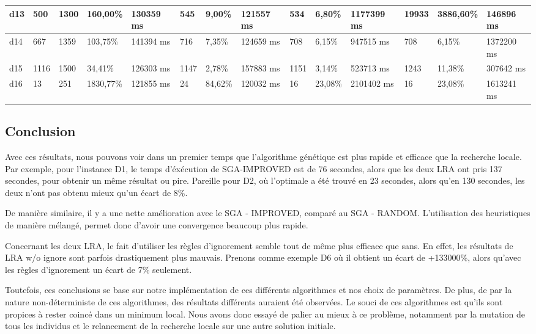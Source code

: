 \begin{table}[]
\begin{adjustbox}{angle=90}
{\begin{tabular}{|c|c|l|l|l|l|l|l|l|l|l|l|l|l|}
\multicolumn{1}{|l|}{d13} & \multicolumn{1}{l|}{500} &1300 & 160,00\% & 130359 ms  & 545 & 9,00\% & 121557 ms  & 534 & 6,80\% & 1177399 ms  & 19933 & 3886,60\% & 146896 ms \\ \hline
\multicolumn{1}{|l|}{d14} & \multicolumn{1}{l|}{667} &1359 & 103,75\% & 141394 ms  & 716 & 7,35\% & 124659 ms  & 708 & 6,15\% & 947515 ms  & 708 & 6,15\% & 1372200 ms \\ \hline
\multicolumn{1}{|l|}{d15} & \multicolumn{1}{l|}{1116} &1500 & 34,41\% & 126303 ms  & 1147 & 2,78\% & 157883 ms  & 1151 & 3,14\% & 523713 ms  & 1243 & 11,38\% & 307642 ms \\ \hline
\multicolumn{1}{|l|}{d16} & \multicolumn{1}{l|}{13} &251 & 1830,77\% & 121855 ms  & 24 & 84,62\% & 120032 ms  & 16 & 23,08\% & 2101402 ms  & 16 & 23,08\% & 1613241 ms \\ \hline

\end{tabular}}
\end{adjustbox}
\end{table}

\newpage
	\subsection{Conclusion}
	Avec ces résultats, nous pouvons voir dans un premier temps que l'algorithme génétique est plus rapide et efficace que la recherche locale. Par exemple, pour l'instance D1, le temps d'éxécution de SGA-IMPROVED est de 76 secondes, alors que 
les deux LRA ont pris 137 secondes, pour obtenir un même résultat ou pire. Pareille pour D2, où l'optimale a été trouvé en 23 secondes, alors qu'en 130 secondes, les deux n'ont pas obtenu mieux qu'un écart de 8\%.

	De manière similaire, il y a une nette amélioration avec le SGA - IMPROVED, comparé au SGA - RANDOM. L'utilisation des heuristiques de manière mélangé, permet donc d'avoir une convergence beaucoup plus rapide.

	Concernant les deux LRA, le fait d'utiliser les règles d'ignorement semble tout de même plus efficace que sans. En effet, les résultats de LRA w/o ignore sont parfois drastiquement plus mauvais. Prenons comme exemple D6 où il 
obtient un écart de +133000\%, alors qu'avec les règles d'ignorement un écart de 7\% seulement.

	Toutefois, ces conclusions se base sur notre implémentation de ces différents algorithmes et nos choix de paramètres. De plus, de par la nature non-déterministe de ces algorithmes, des résultats différents auraient été observées.
Le souci de ces algorithmes est qu'ils sont propices à rester coincé dans un minimum local. Nous avons donc essayé de palier au mieux à ce problème, notamment par la mutation de tous les individus et le relancement de la recherche locale sur une autre
solution initiale.

\newpage
\begin{appendix}
\listoffigures
\listoftables
\end{appendix}


